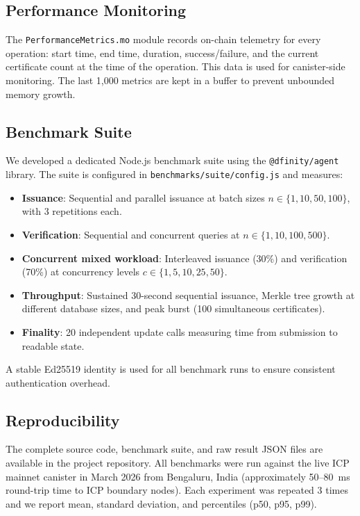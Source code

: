 \documentclass[journal]{IEEEtran}
\begin{document}
\subsection{Performance Monitoring}

The \texttt{PerformanceMetrics.mo} module records on-chain telemetry for every operation: start time, end time, duration, success/failure, and the current certificate count at the time of the operation. This data is used for canister-side monitoring. The last 1,000 metrics are kept in a buffer to prevent unbounded memory growth.

\subsection{Benchmark Suite}

We developed a dedicated Node.js benchmark suite using the \texttt{@dfinity/agent} library. The suite is configured in \texttt{benchmarks/suite/config.js} and measures:

\begin{itemize}[leftmargin=*]
  \item \textbf{Issuance}: Sequential and parallel issuance at batch sizes $n \in \{1, 10, 50, 100\}$, with 3 repetitions each.
  \item \textbf{Verification}: Sequential and concurrent queries at $n \in \{1, 10, 100, 500\}$.
  \item \textbf{Concurrent mixed workload}: Interleaved issuance (30\%) and verification (70\%) at concurrency levels $c \in \{1, 5, 10, 25, 50\}$.
  \item \textbf{Throughput}: Sustained 30-second sequential issuance, Merkle tree growth at different database sizes, and peak burst (100 simultaneous certificates).
  \item \textbf{Finality}: 20 independent update calls measuring time from submission to readable state.
\end{itemize}

A stable Ed25519 identity is used for all benchmark runs to ensure consistent authentication overhead.

\subsection{Reproducibility}

The complete source code, benchmark suite, and raw result JSON files are available in the project repository. All benchmarks were run against the live ICP mainnet canister in March 2026 from Bengaluru, India (approximately 50--80~ms round-trip time to ICP boundary nodes). Each experiment was repeated 3 times and we report mean, standard deviation, and percentiles (p50, p95, p99).
\end{document}
